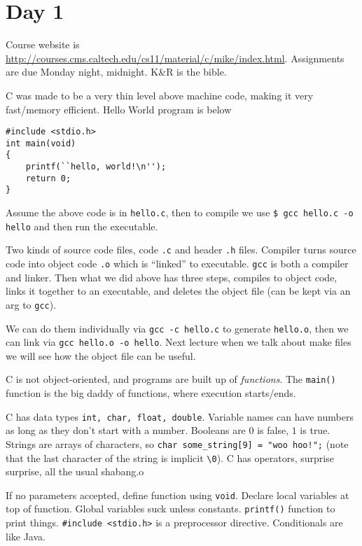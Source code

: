 \documentclass[10pt,landscape, twocolumn]{article}
\begin{document}
\pagestyle{fancy}

\section*{Day 1}

Course website is \url{http://courses.cms.caltech.edu/cs11/material/c/mike/index.html}. Assignments are due Monday night, midnight. K\&R is the bible.

C was made to be a very thin level above machine code, making it very fast/memory efficient. Hello World program is below
\begin{verbatim}
#include <stdio.h>
int main(void)
{
    printf(``hello, world!\n'');
    return 0;
}
\end{verbatim}

Assume the above code is in \texttt{hello.c}, then to compile we use \texttt{\$ gcc hello.c -o hello} and then run the executable.

Two kinds of source code files, code \texttt{.c} and header \texttt{.h} files. Compiler turns source code into object code \texttt{.o} which is ``linked'' to executable. \texttt{gcc} is both a compiler and linker. Then what we did above has three steps, compiles to object code, links it together to an executable, and deletes the object file (can be kept via an arg to \texttt{gcc}).

We can do them individually via \texttt{gcc -c hello.c} to generate \texttt{hello.o}, then we can link via \texttt{gcc hello.o -o hello}. Next lecture when we talk about make files we will see how the object file can be useful.

C is not object-oriented, and programs are built up of \emph{functions}. The \texttt{main()} function is the big daddy of functions, where execution starts/ends.

C has data types \texttt{int, char, float, double}. Variable names can have numbers as long as they don't start with a number. Booleans are $0$ is false, $1$ is true. Strings are arrays of characters, so \texttt{char some\_string[9] = "woo hoo!";} (note that the last character of the string is implicit \texttt{\textbackslash 0}). C has operators, surprise surprise, all the usual shabang.o

If no parameters accepted, define function using \texttt{void}. Declare local variables at top of function. Global variables suck unless constants. \texttt{printf()} function to print things. \texttt{\#include <stdio.h>} is a preprocessor directive. Conditionals are like Java.
\end{document}
